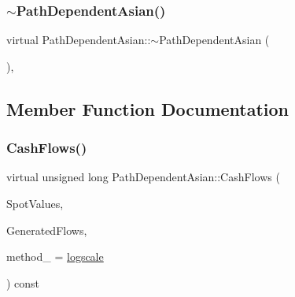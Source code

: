 \hypertarget{classPathDependentAsian_acbd679e3574b509d6fcf36eba8227769}{}\label{classPathDependentAsian_acbd679e3574b509d6fcf36eba8227769} 
\subsubsection{\texorpdfstring{$\sim$\+Path\+Dependent\+Asian()}{~PathDependentAsian()}}
{\footnotesize\ttfamily virtual Path\+Dependent\+Asian\+::$\sim$\+Path\+Dependent\+Asian (\begin{DoxyParamCaption}{ }\end{DoxyParamCaption})\hspace{0.3cm}{\ttfamily [inline]}, {\ttfamily [virtual]}}



\subsection{Member Function Documentation}
\hypertarget{classPathDependentAsian_a404a8456848eff0edc780f2ca05ad856}{}\label{classPathDependentAsian_a404a8456848eff0edc780f2ca05ad856} 
\subsubsection{\texorpdfstring{Cash\+Flows()}{CashFlows()}}
{\footnotesize\ttfamily virtual unsigned long Path\+Dependent\+Asian\+::\+Cash\+Flows (\begin{DoxyParamCaption}\item[{const \hyperlink{classMJArray}{M\+J\+Array} \&}]{Spot\+Values,  }\item[{std\+::vector$<$ \hyperlink{classMyCashFlow_1_1CashFlow}{My\+Cash\+Flow\+::\+Cash\+Flow} $>$ \&}]{Generated\+Flows,  }\item[{\hyperlink{PathDependent_8h_abed946c62f140eb7ff2ac742e6ad9497}{method}}]{method\+\_\+ = {\ttfamily \hyperlink{PathDependent_8h_abed946c62f140eb7ff2ac742e6ad9497a064d3d3358889658ce07fe9f3191d1fd}{logscale}} }\end{DoxyParamCaption}) const\hspace{0.3cm}{\ttfamily [virtual]}}

